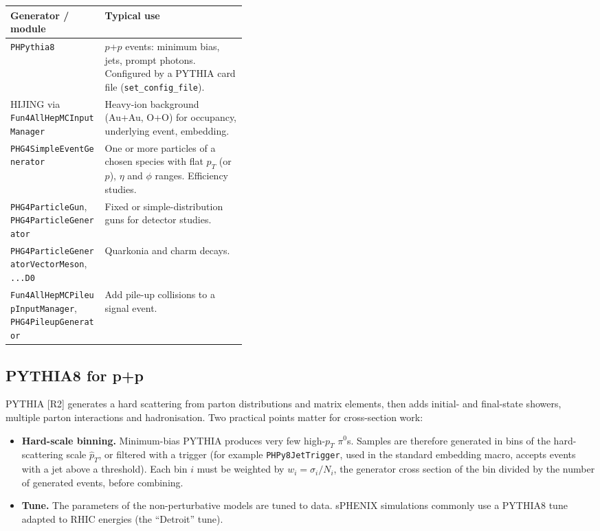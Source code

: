 \documentclass[11pt,letterpaper]{article}
\begin{document}
{\small\par\noindent\begin{tabularx}{\linewidth}{@{}>{\raggedright\arraybackslash}p{0.40\linewidth}X@{}}\toprule
Generator / module & Typical use \\\midrule
\texttt{PHPythia8} & $p$+$p$ events: minimum bias, jets, prompt photons. Configured by a PYTHIA card file (\texttt{set\_config\_file}). \\
HIJING via \texttt{Fun4AllHepMCInputManager} & Heavy-ion background (Au+Au, O+O) for occupancy, underlying event, embedding. \\
\texttt{PHG4SimpleEventGenerator} & One or more particles of a chosen species with flat $p_T$ (or $p$), $\eta$ and $\phi$ ranges. Efficiency studies. \\
\texttt{PHG4ParticleGun}, \texttt{PHG4ParticleGenerator} & Fixed or simple-distribution guns for detector studies. \\
\texttt{PHG4ParticleGeneratorVectorMeson}, \texttt{...D0} & Quarkonia and charm decays. \\
\texttt{Fun4AllHepMCPileupInputManager}, \texttt{PHG4PileupGenerator} & Add pile-up collisions to a signal event. \\\bottomrule
\end{tabularx}}

\subsection{PYTHIA8 for p+p}
PYTHIA [R2] generates a hard scattering from parton distributions and matrix elements, then adds initial- and final-state showers,
multiple parton interactions and hadronisation. Two practical points matter for cross-section work:
\begin{itemize}
\item \textbf{Hard-scale binning.} Minimum-bias PYTHIA produces very few high-$p_T$ $\pi^0$s. Samples are therefore generated in bins of the hard-scattering scale $\hat{p}_T$,
or filtered with a trigger (for example \texttt{PHPy8JetTrigger}, used in the standard embedding macro, accepts events with a jet above a threshold).
Each bin $i$ must be weighted by $w_i=\sigma_i/N_i$, the generator cross section of the bin divided by the number of generated events, before combining.
\item \textbf{Tune.} The parameters of the non-perturbative models are tuned to data. sPHENIX simulations commonly use a PYTHIA8 tune adapted to RHIC energies (the ``Detroit'' tune).
\end{itemize}
\end{document}
